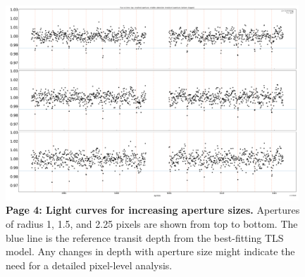 \documentclass[12pt,twocolumn,tighten]{aastex62}
\begin{document}
\begin{figure}[!h]
	\begin{center}
		\leavevmode
		\includegraphics[width=0.98\textwidth]{gaiatwo0005541111035713815552-0007_page04.pdf}
	\end{center}
	\vspace{-0.5cm}
	\caption{
		{\bf Page 4: Light curves for increasing aperture sizes.} 
		Apertures of radius 1, 1.5, and 2.25 pixels are shown from top to bottom.
		The blue line is the reference transit depth from the best-fitting TLS model.
		Any changes in depth with aperture size might indicate the need for a 
		detailed pixel-level analysis.
		\label{fig:pg4}
	}
\end{figure}
\end{document}
